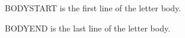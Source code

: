 \documentclass{careerdossier-letter}
\begin{document}
\MakeCDossierLetterhead

BODYSTART is the first line of the letter body.

BODYEND is the last line of the letter body.

\MakeCDossierClosing
\end{document}
